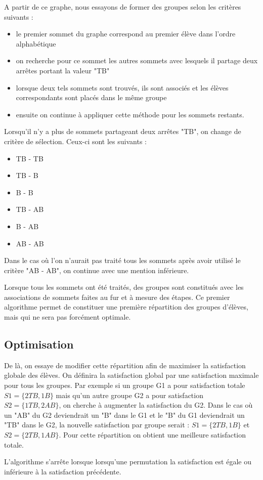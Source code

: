 \documentclass[10pt,a4paper]{scrartcl}
\begin{document}
A partir de ce graphe, nous essayons de former des groupes selon les critères suivants :
\begin{itemize}
	\item le premier sommet du graphe correspond au premier élève dans l'ordre alphabétique
	\item on recherche pour ce sommet les autres sommets avec lesquels il partage deux arrêtes portant la valeur "TB"
	\item lorsque deux tels sommets sont trouvés, ils sont associés et les élèves correspondants sont placés dans le même groupe
	\item ensuite on continue à appliquer cette méthode pour les sommets restants.
\end{itemize}
 Lorsqu'il n'y a plus de sommets partageant deux arrêtes "TB", on change de critère de sélection. Ceux-ci sont les suivants :
 \begin{itemize}
 	\item TB - TB
 	\item TB - B
 	\item B - B
 	\item TB - AB
 	\item B - AB
 	\item AB - AB
 \end{itemize}

Dans le cas où l'on n'aurait pas traité tous les sommets après avoir utilisé le critère "AB - AB", on continue avec une mention inférieure.

Lorsque tous les sommets ont été traités, des groupes sont constitués avec les associations de sommets faites au fur et à mesure des étapes.
Ce premier algorithme permet de constituer une première répartition des groupes d'élèves, mais qui ne sera pas forcément optimale.

\subsection{Optimisation}
De là, on essaye de modifier cette répartition afin de maximiser la satisfaction globale des élèves. On définira la satisfaction global par une satisfaction maximale pour tous les groupes. 
Par exemple si un groupe G1 a pour satisfaction totale $S1 = \{2TB, 1B\}$ mais qu'un autre groupe G2 a pour satisfaction $S2 = \{1TB, 2AB\}$, on cherche à augmenter la satisfaction du G2.
Dans le cas où un "AB" du G2 deviendrait un "B" dans le G1 et le "B" du G1 deviendrait un "TB" dans le G2, la nouvelle satisfaction par groupe serait : $S1 = \{2TB, 1B\}$ et $S2 = \{2TB, 1AB\}$.
Pour cette répartition on obtient une meilleure satisfaction totale.

L'algorithme s'arrête lorsque lorsqu'une permutation la satisfaction est égale ou inférieure à la satisfaction précédente.
\end{document}
